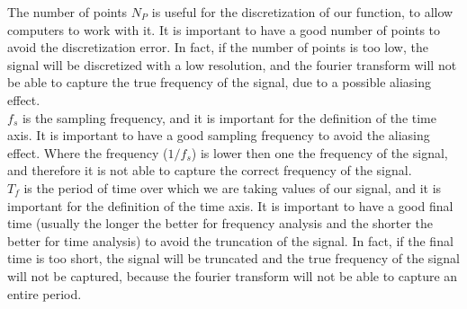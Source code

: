 \documentclass{article}
\begin{document}
The number of points $N_P$ is useful for the discretization of our function, to allow computers to work with it. It is important to have a good number of points to avoid the discretization error. In fact, if the number of points is too low, the signal will be discretized with a low resolution, and the fourier transform will not be able to capture the true frequency of the signal, due to a possible aliasing effect. \\
$f_s$ is the sampling frequency, and it is important for the definition of the time axis. It is important to have a good sampling frequency to avoid the aliasing effect. Where the frequency ($1/f_s$) is lower then one the frequency of the signal, and therefore it is not able to capture the correct frequency of the signal. \\
$T_f$ is the period of time over which we are taking values of our signal, and it is important for the definition of the time axis. It is important to have a good final time (usually the longer the better for frequency analysis and the shorter the better for time analysis) to avoid the truncation of the signal. In fact, if the final time is too short, the signal will be truncated and the true frequency of the signal will not be captured, because the fourier transform will not be able to capture an entire period. \\
\end{document}
